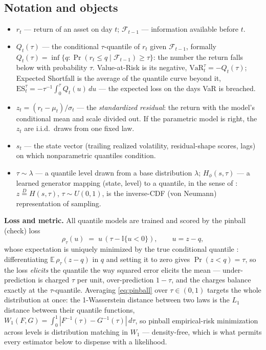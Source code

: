 \documentclass[11pt]{article}
\newcommand{\VaR}{\mathrm{VaR}}
\newcommand{\ES}{\mathrm{ES}}
\theoremstyle{remark}
\begin{document}
\subsection{Notation and objects}\label{sec:notation}

\begin{itemize}[leftmargin=1.5em,itemsep=0pt]
\item $r_t$ --- return of an asset on day $t$; $\mathcal{F}_{t-1}$ ---
information available before $t$.
\item $Q_t(\tau)$ --- the conditional $\tau$-quantile of $r_t$ given
$\mathcal{F}_{t-1}$, formally
$Q_t(\tau) = \inf\{q : \Pr(r_t \le q \mid \mathcal{F}_{t-1}) \ge \tau\}$:
the number the return falls below with probability $\tau$. Value-at-Risk
is its negative, $\VaR_t^{\tau} = -Q_t(\tau)$;
Expected Shortfall is the average of the quantile curve beyond it,
$\ES_t^{\tau} = -\tau^{-1}\int_0^{\tau} Q_t(u)\,du$ --- the expected
loss on the days VaR is breached.
\item $z_t = (r_t-\mu_t)/\sigma_t$ --- the \emph{standardized residual}:
the return with the model's conditional mean and scale divided out. If
the parametric model is right, the $z_t$ are i.i.d.\ draws from one
fixed law.
\item $s_t$ --- the state vector (trailing realized volatility,
residual-shape scores, lags) on which nonparametric quantiles condition.
\item $\tau \sim \lambda$ --- a quantile level drawn from a base
distribution $\lambda$; $H_\phi(s,\tau)$ --- a learned generator mapping
(state, level) to a quantile, in the sense of
\citet{polson2023gbc}: $z \overset{D}{=} H(s,\tau)$, $\tau\sim U(0,1)$,
is the inverse-CDF (von Neumann) representation of sampling.
\end{itemize}

\noindent\textbf{Loss and metric.} All quantile models are trained and
scored by the pinball (check) loss
\begin{equation}
\rho_\tau(u) \;=\; u\,(\tau - \mathbb{I}\{u<0\}),
\qquad u = z - q,
\label{eq:pinball}
\end{equation}
whose expectation is uniquely minimized by the true conditional quantile
\citep{koenker1978}: differentiating
$\mathbb{E}\,\rho_\tau(z - q)$ in $q$ and setting it to zero gives
$\Pr(z < q) = \tau$, so the loss \emph{elicits} the quantile the way
squared error elicits the mean --- under-prediction is charged $\tau$
per unit, over-prediction $1-\tau$, and the charges balance exactly at
the $\tau$-quantile. Averaging \eqref{eq:pinball} over $\tau\in(0,1)$
targets the whole distribution at once: the 1-Wasserstein distance
between two laws is the $L_1$ distance between their quantile functions,
$W_1(F,G)=\int_0^1 |F^{-1}(\tau)-G^{-1}(\tau)|\,d\tau$, so pinball
empirical-risk minimization across levels is distribution matching in
$W_1$ --- density-free, which is what permits every estimator below to
dispense with a likelihood.
\end{document}
